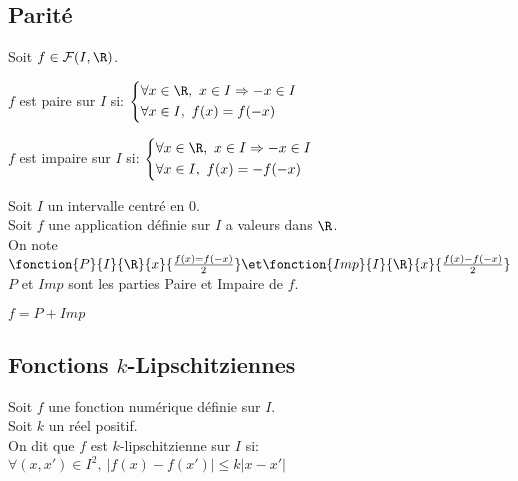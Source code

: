 \documentclass[12pt,twoside,a4paper]{article}
\begin{document}
		\subsection{Parit\'e}
			\begin{defi}
				Soit $f\in \mathcal{F}(I,\R)$.
				\begin{liste}
					\item $f$ est paire sur $I$ si:
						$\left\{\begin{aligned}
						& \forall x\in \R,\ x\in I\Rightarrow -x\in I\\
						& \forall x\in I,\ f(x)=f(-x)
						\end{aligned} \right.$
					\item $f$ est impaire sur $I$ si:
						$\left\{\begin{aligned}
						& \forall x\in \R,\ x\in I\Rightarrow -x\in I\\
						& \forall x\in I,\ f(x)=-f(-x)
						\end{aligned} \right.$
				\end{liste}
			\end{defi}
			\begin{defi}
				Soit $I$ un intervalle centr\'e en $0$.\\
				Soit $f$ une application d\'efinie sur $I$ a valeurs dans $\R$.\\
				On note $\fonction{P}{I}{\R}{x}{\frac{f(x)=f(-x)}{2}} \et \fonction{Imp}{I}{\R}{x}{\frac{f(x)-f(-x)}{2}}$\\
				$P$ et $Imp$ sont les parties Paire et Impaire de $f$.
			\end{defi}
			\begin{prop}
				$f=P+Imp$
			\end{prop}
		\subsection{Fonctions $k$-Lipschitziennes}
			\begin{defi}
				Soit $f$ une fonction num\'erique d\'efinie sur $I$.\\
				Soit $k$ un r\'eel positif.\\
				On dit que $f$ est $k$-lipschitzienne sur $I$ si:\\
				$\forall (x,x')\in I^{2},\ \left| f(x)-f(x') \right| \leqslant k \left|x-x' \right|$
			\end{defi}
\end{document}
